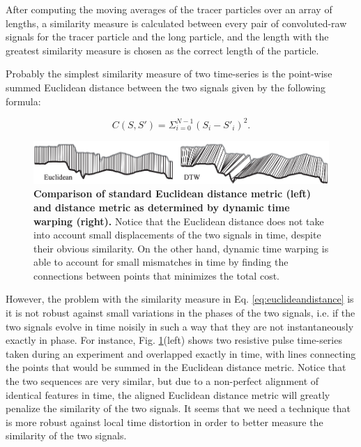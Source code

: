 			
			After computing the moving averages of the tracer particles over an array of lengths, a similarity measure is calculated between every pair of convoluted-raw signals for the tracer particle and the long particle, and the length with the greatest similarity measure is chosen as the correct length of the particle.
			
			Probably the simplest similarity measure of two time-series is the point-wise summed Euclidean distance between the two signals given by the following formula:
			
			\begin{equation}\label{eq:euclideandistance}
				C\left(S, S'\right)=\Sigma_{i=0}^{N-1}\left(S_{i}-S'_{i}\right)^{2}.
			\end{equation}
			
			\begin{figure}
				\includegraphics[width=\textwidth]{eucliddtw}
				\caption{\textbf{Comparison of standard Euclidean distance metric (left) and distance metric as determined by dynamic time warping (right).} Notice that the Euclidean distance does not take into account small displacements of the two signals in time, despite their obvious similarity. On the other hand, dynamic time warping is able to account for small mismatches in time by finding the connections between points that minimizes the total cost.}
				\label{fig:eucliddtw}
			\end{figure}

			
			However, the problem with the similarity measure in Eq. \ref{eq:euclideandistance} is it is not robust against small variations in the phases of the two signals, i.e. if the two signals evolve in time noisily in such a way that they are not instantaneously exactly in phase. For instance, Fig. \ref{fig:eucliddtw}(left) shows two resistive pulse time-series taken during an experiment and overlapped exactly in time, with lines connecting the points that would be summed in the Euclidean distance metric\cite{Keogh2005}. Notice that the two sequences are very similar, but due to a non-perfect alignment of identical features in time, the aligned Euclidean distance metric will greatly penalize the similarity of the two signals. It seems that we need a technique that is more robust against local time distortion in order to better measure the similarity of the two signals.
		
